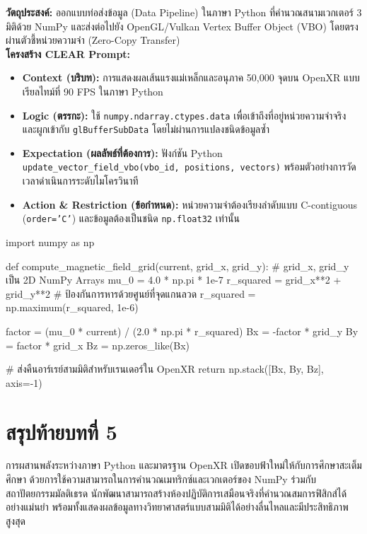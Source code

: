 \begin{aipromptbox}
\textbf{วัตถุประสงค์:} ออกแบบท่อส่งข้อมูล (Data Pipeline) ในภาษา Python ที่คำนวณสนามเวกเตอร์ 3 มิติด้วย NumPy และส่งต่อไปยัง OpenGL/Vulkan Vertex Buffer Object (VBO) โดยตรงผ่านตัวชี้หน่วยความจำ (Zero-Copy Transfer)\\
\textbf{โครงสร้าง CLEAR Prompt:}
\begin{itemize}[topsep=1pt, itemsep=1pt, leftmargin=1.2em]
    \item \textbf{Context (บริบท):} การแสดงผลเส้นแรงแม่เหล็กและอนุภาค 50,000 จุดบน OpenXR แบบเรียลไทม์ที่ 90 FPS ในภาษา Python
    \item \textbf{Logic (ตรรกะ):} ใช้ \texttt{numpy.ndarray.ctypes.data} เพื่อเข้าถึงที่อยู่หน่วยความจำจริง และผูกเข้ากับ \texttt{glBufferSubData} โดยไม่ผ่านการแปลงชนิดข้อมูลซ้ำ
    \item \textbf{Expectation (ผลลัพธ์ที่ต้องการ):} ฟังก์ชัน Python \texttt{update\_vector\_field\_vbo(vbo\_id, positions, vectors)} พร้อมตัวอย่างการวัดเวลาดำเนินการระดับไมโครวินาที
    \item \textbf{Action \& Restriction (ข้อกำหนด):} หน่วยความจำต้องเรียงลำดับแบบ C-contiguous (\texttt{order='C'}) และข้อมูลต้องเป็นชนิด \texttt{np.float32} เท่านั้น
\end{itemize}
\end{aipromptbox}

\begin{codebox}
import numpy as np

def compute_magnetic_field_grid(current, grid_x, grid_y):
    # grid_x, grid_y เป็น 2D NumPy Arrays
    mu_0 = 4.0 * np.pi * 1e-7
    r_squared = grid_x**2 + grid_y**2
    # ป้องกันการหารด้วยศูนย์ที่จุดแกนลวด
    r_squared = np.maximum(r_squared, 1e-6)

    factor = (mu_0 * current) / (2.0 * np.pi * r_squared)
    Bx = -factor * grid_y
    By = factor * grid_x
    Bz = np.zeros_like(Bx)

    # ส่งคืนอาร์เรย์สามมิติสำหรับเรนเดอร์ใน OpenXR
    return np.stack([Bx, By, Bz], axis=-1)
\end{codebox}

\section*{สรุปท้ายบทที่ 5}

การผสานพลังระหว่างภาษา Python และมาตรฐาน OpenXR เปิดขอบฟ้าใหม่ให้กับการศึกษาสะเต็มศึกษา ด้วยการใช้ความสามารถในการคำนวณเมทริกซ์และเวกเตอร์ของ NumPy ร่วมกับสถาปัตยกรรมมัลติเธรด นักพัฒนาสามารถสร้างห้องปฏิบัติการเสมือนจริงที่คำนวณสมการฟิสิกส์ได้อย่างแม่นยำ พร้อมทั้งแสดงผลข้อมูลทางวิทยาศาสตร์แบบสามมิติได้อย่างลื่นไหลและมีประสิทธิภาพสูงสุด

